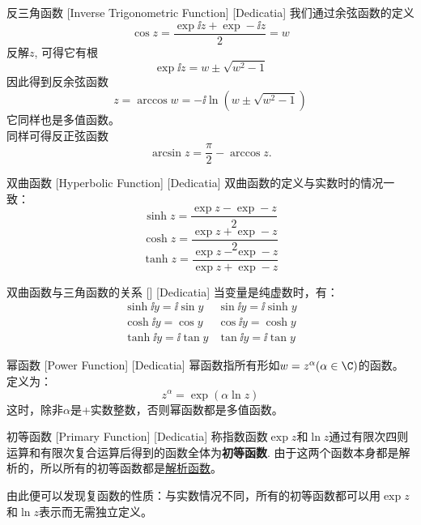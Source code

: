 \documentclass[UTF8]{ctexart}
\newcommand{\AnalyticalFunction}{\hyperref[dfn:AnalyticalFunction]{解析函数}}
\begin{document}
\begin{dfn}
    [UUID]
    {反三角函数}
    [Inverse Trigonometric Function]
    [Dedicatia]
    我们通过余弦函数的定义
    \[\cos z=\frac{\exp\ii z+\exp -\ii z}{2}=w\]
    反解$z$, 可得它有根
    \[\exp\ii z=w\pm\sqrt{w^2-1}\]
    因此得到反余弦函数
    \[z=\arccos w=-\ii\ln(w\pm\sqrt{w^2-1})\]
    它同样也是多值函数。\\
    同样可得反正弦函数
    \[\arcsin z=\frac{\pi}{2}-\arccos z.\]
\end{dfn}
\begin{dfn}
    [UUID]
    {双曲函数}
    [Hyperbolic Function]
    [Dedicatia]
    双曲函数的定义与实数时的情况一致：
    \[\sinh z=\frac{\exp z-\exp -z}{2}\]
    \[\cosh z=\frac{\exp z+\exp -z}{2}\]
    \[\tanh z=\frac{\exp z-\exp -z}{\exp z+\exp -z}\]
\end{dfn}
\begin{ppt}
    [UUID]
    {双曲函数与三角函数的关系}
    []
    [Dedicatia]
    当变量是纯虚数时，有：
    \[\begin{array}{cc}
        \sinh\ii y=\ii\sin y&\sin\ii y=\ii\sinh y\\
        \cosh\ii y=\cos y&\cos\ii y=\cosh y\\
        \tanh\ii y=\ii\tan y&\tan\ii y=\ii\tan y
    \end{array}\]
\end{ppt}
\begin{dfn}
    [UUID]
    {幂函数}
    [Power Function]
    [Dedicatia]
    幂函数指所有形如$w=z^\alpha (\alpha\in\C)$的函数。定义为：
    \[z^\alpha = \exp(\alpha \ln z)\]
    这时，除非$\alpha$是+实数整数，否则幂函数都是多值函数。
\end{dfn}
\begin{dfn}
    [UUID]
    {初等函数}
    [Primary Function]
    [Dedicatia]
    称指数函数$\exp z$和$\ln z$通过有限次四则运算和有限次复合运算后得到的函数全体为\textbf{初等函数}. 由于这两个函数本身都是解析的，所以所有的初等函数都是\AnalyticalFunction 。
\end{dfn}
由此便可以发现复函数的性质：与实数情况不同，所有的初等函数都可以用$\exp z$和$\ln z$表示而无需独立定义。
\end{document}
